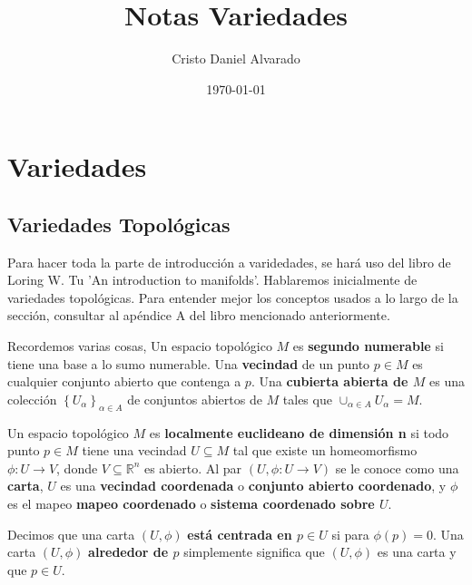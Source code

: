 \documentclass[12pt]{report}
\theoremstyle{largebreak}
\begin{document}
    \title{Notas Variedades}
    \author{Cristo Daniel Alvarado}
    \date{\today}
    \maketitle

    \tableofcontents %

    \setcounter{chapter}{3} %
    
    \chapter{Variedades}
    
    \section{Variedades Topológicas}
    
    Para hacer toda la parte de introducción a varidedades, se hará uso del libro de Loring W. Tu 'An introduction to manifolds'. Hablaremos inicialmente de variedades topológicas. Para entender mejor los conceptos usados a lo largo de la sección, consultar al apéndice A del libro mencionado anteriormente.

    Recordemos varias cosas, Un espacio topológico $M$ es \textbf{segundo numerable} si tiene una base a lo sumo numerable. Una \textbf{vecindad} de un punto $p\in M$ es cualquier conjunto abierto que contenga a $p$. Una \textbf{cubierta abierta de $M$} es una colección $\left\{U_\alpha\right\}_{\alpha\in A}$ de conjuntos abiertos de $M$ tales que $\cup_{\alpha\in A}U_\alpha=M$.

    \begin{mydef}
        Un espacio topológico $M$ es \textbf{localmente euclideano de dimensión n} si todo punto $p\in M$ tiene una vecindad $U\subseteq M$ tal que existe un homeomorfismo $\phi:U\rightarrow V$, donde $V\subseteq\mathbb{R}^n$ es abierto. 
        Al par $(U, \phi:U\rightarrow V)$ se le conoce como una \textbf{carta}, $U$ es una \textbf{vecindad coordenada} o \textbf{conjunto abierto coordenado}, y $\phi$ es el mapeo \textbf{mapeo coordenado} o \textbf{sistema coordenado sobre $U$}.

        Decimos que una carta $(U,\phi)$ \textbf{está centrada en $p\in U$} si para $\phi(p)=0$. Una carta $(U,\phi)$ \textbf{alrededor de $p$} simplemente significa que $(U,\phi)$ es una carta y que $p\in U$.
    \end{mydef} 
\end{document}
